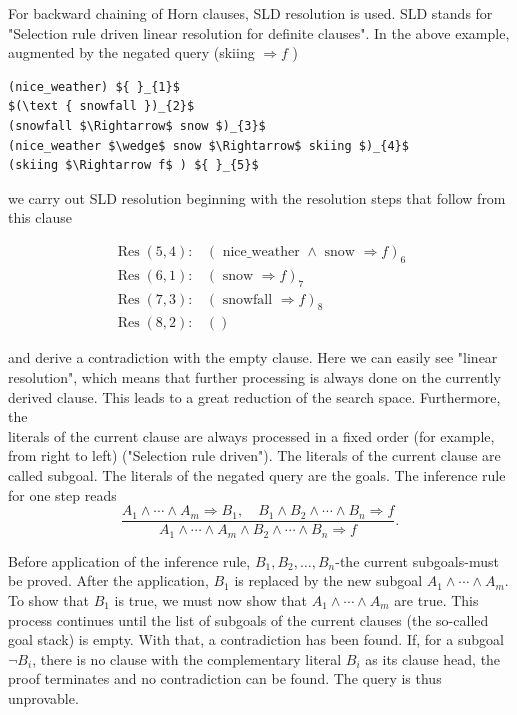 \documentclass[10pt]{book}
\begin{document}
For backward chaining of Horn clauses, SLD resolution is used. SLD stands for "Selection rule driven linear resolution for definite clauses". In the above example, augmented by the negated query (skiing $\Rightarrow f$ )

\begin{verbatim}
(nice_weather) ${ }_{1}$
$(\text { snowfall })_{2}$
(snowfall $\Rightarrow$ snow $)_{3}$
(nice_weather $\wedge$ snow $\Rightarrow$ skiing $)_{4}$
(skiing $\Rightarrow f$ ) ${ }_{5}$
\end{verbatim}

we carry out SLD resolution beginning with the resolution steps that follow from this clause

$$
\begin{array}{ll}
\operatorname{Res}(5,4): & (\text { nice_weather } \wedge \text { snow } \Rightarrow f)_{6} \\
\operatorname{Res}(6,1): & (\text { snow } \Rightarrow f)_{7} \\
\operatorname{Res}(7,3): & (\text { snowfall } \Rightarrow f)_{8} \\
\operatorname{Res}(8,2): & ()
\end{array}
$$

and derive a contradiction with the empty clause. Here we can easily see "linear resolution", which means that further processing is always done on the currently derived clause. This leads to a great reduction of the search space. Furthermore, the\\
literals of the current clause are always processed in a fixed order (for example, from right to left) ("Selection rule driven"). The literals of the current clause are called subgoal. The literals of the negated query are the goals. The inference rule for one step reads
$$
\frac{A_{1} \wedge \cdots \wedge A_{m} \Rightarrow B_{1}, \quad B_{1} \wedge B_{2} \wedge \cdots \wedge B_{n} \Rightarrow f}{A_{1} \wedge \cdots \wedge A_{m} \wedge B_{2} \wedge \cdots \wedge B_{n} \Rightarrow f} .
$$

Before application of the inference rule, $B_{1}, B_{2}, \ldots, B_{n}$-the current subgoals-must be proved. After the application, $B_{1}$ is replaced by the new subgoal $A_{1} \wedge \cdots \wedge A_{m}$. To show that $B_{1}$ is true, we must now show that $A_{1} \wedge \cdots \wedge A_{m}$ are true. This process continues until the list of subgoals of the current clauses (the so-called goal stack) is empty. With that, a contradiction has been found. If, for a subgoal $\neg B_{i}$, there is no clause with the complementary literal $B_{i}$ as its clause head, the proof terminates and no contradiction can be found. The query is thus unprovable.
\end{document}
